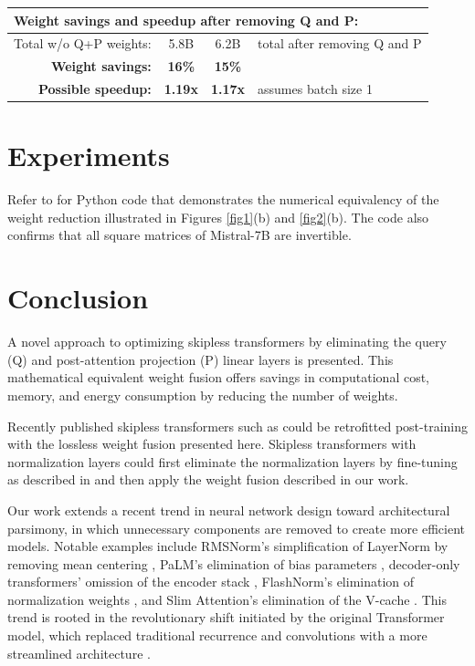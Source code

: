 \documentclass{article}
\begin{document}
\begin{center}
\begin{tabular}{lccl}
  \multicolumn{4}{l}{\textbf{Weight savings and speedup after removing Q and P:}}                           \\ \hline
  Total w/o Q+P weights:                           & 5.8B           & 6.2B   & total after removing Q and P \\
  \multicolumn{1}{r}{\textbf{Weight savings:}}     & \textbf{16\%}  & \textbf{15\%}  &                      \\
  \multicolumn{1}{r}{\textbf{Possible speedup:}}   & \textbf{1.19x} & \textbf{1.17x} & assumes batch size 1 \\ \hline
\end{tabular} \end{center}
\endgroup

\section{Experiments}
Refer to \cite{tricks} for Python code that demonstrates the numerical equivalency of the weight reduction illustrated in Figures \ref{fig1}(b) and \ref{fig2}(b). The code also confirms that all square matrices of Mistral-7B are invertible.

\section{Conclusion}
A novel approach to optimizing skipless transformers by eliminating the query (Q) and post-attention projection (P) linear layers is presented. This mathematical equivalent weight fusion offers savings in computational cost, memory, and energy consumption by reducing the number of weights.

Recently published skipless transformers such as \cite{skipless2, skipless} could be retrofitted post-training with the lossless weight fusion presented here. Skipless transformers with normalization layers could first eliminate the normalization layers by fine-tuning as described in \cite{remove-norm, remove-norm2} and then apply the weight fusion described in our work.

Our work extends a recent trend in neural network design toward architectural parsimony, in which unnecessary components are removed to create more efficient models. Notable examples include RMSNorm’s simplification of LayerNorm by removing mean centering \cite{rms}, PaLM’s elimination of bias parameters \cite{PaLM}, decoder-only transformers’ omission of the encoder stack \cite{genWiki}, FlashNorm's elimination of normalization weights \cite{flashNorm}, and Slim Attention's elimination of the V-cache \cite{slimAttn}. This trend is rooted in the revolutionary shift initiated by the original Transformer model, which replaced traditional recurrence and convolutions with a more streamlined architecture \cite{vanilla}.
\end{document}
